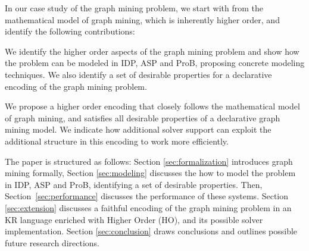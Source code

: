 In our case study of the graph mining problem, we start with from the mathematical model of graph mining, which is inherently higher order, and identify the following contributions:
\begin{compactitem}
\item We identify the higher order aspects of the graph mining problem and show how the problem can be modeled in IDP, ASP and ProB, proposing concrete modeling techniques.
We also identify a set of desirable properties for a declarative encoding of the graph mining problem.
\item 
We propose a higher order encoding that closely follows the mathematical model of graph mining, and satisfies all desirable properties of a declarative graph mining model.
We indicate how additional solver support can exploit the additional structure in this encoding to work more efficiently.
\end{compactitem}
The paper is structured as follows: Section \ref{sec:formalization} introduces graph mining formally, Section \ref{sec:modeling} discusses the how to model the problem in IDP, ASP and ProB, identifying a set of desirable properties.
Then, Section~\ref{sec:performance} discusses the performance of these systems.
Section \ref{sec:extension} discusses a faithful encoding of the graph mining problem in an KR language enriched with Higher Order (HO), and its possible solver implementation. Section \ref{sec:conclusion} draws conclusions and outlines possible future research directions.
